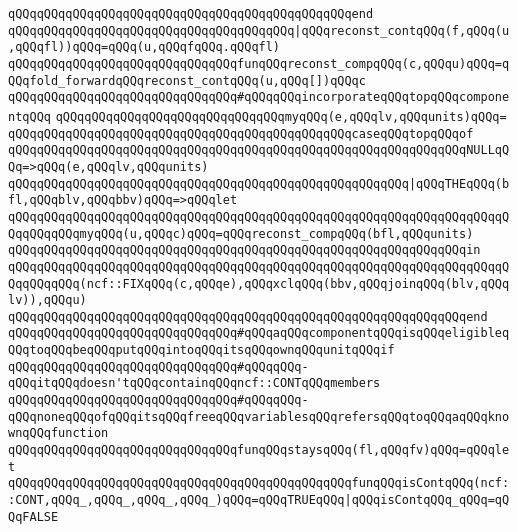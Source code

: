 \verb|qQQqqQQqqQQqqQQqqQQqqQQqqQQqqQQqqQQqqQQqqQQqqQQqend|\newline
\verb|qQQqqQQqqQQqqQQqqQQqqQQqqQQqqQQqqQQqqQQq|\verb#|qQQqreconst_contqQQq(f,qQQq(u,qQQqfl))qQQq=qQQq(u,qQQqfqQQq.qQQqfl)#\newline
\verb|qQQqqQQqqQQqqQQqqQQqqQQqqQQqqQQqfunqQQqreconst_compqQQq(c,qQQqu)qQQq=qQQqfold_forwardqQQqreconst_contqQQq(u,qQQq[])qQQqc|\newline
\newline
\verb|qQQqqQQqqQQqqQQqqQQqqQQqqQQqqQQq#qQQqqQQqincorporateqQQqtopqQQqcomponentqQQq|\newline
\verb|qQQqqQQqqQQqqQQqqQQqqQQqqQQqqQQqmyqQQq(e,qQQqlv,qQQqunits)qQQq=|\newline
\verb|qQQqqQQqqQQqqQQqqQQqqQQqqQQqqQQqqQQqqQQqqQQqqQQqcaseqQQqtopqQQqof|\newline
\verb|qQQqqQQqqQQqqQQqqQQqqQQqqQQqqQQqqQQqqQQqqQQqqQQqqQQqqQQqqQQqqQQqNULLqQQq=>qQQq(e,qQQqlv,qQQqunits)|\newline
\verb|qQQqqQQqqQQqqQQqqQQqqQQqqQQqqQQqqQQqqQQqqQQqqQQqqQQqqQQq|\verb#|qQQqTHEqQQq(bfl,qQQqblv,qQQqbbv)qQQq=>qQQqlet#\newline
\verb|qQQqqQQqqQQqqQQqqQQqqQQqqQQqqQQqqQQqqQQqqQQqqQQqqQQqqQQqqQQqqQQqqQQqqQQqqQQqqQQqmyqQQq(u,qQQqc)qQQq=qQQqreconst_compqQQq(bfl,qQQqunits)|\newline
\verb|qQQqqQQqqQQqqQQqqQQqqQQqqQQqqQQqqQQqqQQqqQQqqQQqqQQqqQQqqQQqqQQqin|\newline
\verb|qQQqqQQqqQQqqQQqqQQqqQQqqQQqqQQqqQQqqQQqqQQqqQQqqQQqqQQqqQQqqQQqqQQqqQQqqQQqqQQq(ncf::FIXqQQq(c,qQQqe),qQQqxclqQQq(bbv,qQQqjoinqQQq(blv,qQQqlv)),qQQqu)|\newline
\verb|qQQqqQQqqQQqqQQqqQQqqQQqqQQqqQQqqQQqqQQqqQQqqQQqqQQqqQQqqQQqqQQqend|\newline
\newline
\verb|qQQqqQQqqQQqqQQqqQQqqQQqqQQqqQQq#qQQqaqQQqcomponentqQQqisqQQqeligibleqQQqtoqQQqbeqQQqputqQQqintoqQQqitsqQQqownqQQqunitqQQqif|\newline
\verb|qQQqqQQqqQQqqQQqqQQqqQQqqQQqqQQq#qQQqqQQq-qQQqitqQQqdoesn'tqQQqcontainqQQqncf::CONTqQQqmembers|\newline
\verb|qQQqqQQqqQQqqQQqqQQqqQQqqQQqqQQq#qQQqqQQq-qQQqnoneqQQqofqQQqitsqQQqfreeqQQqvariablesqQQqrefersqQQqtoqQQqaqQQqknownqQQqfunction|\newline
\verb|qQQqqQQqqQQqqQQqqQQqqQQqqQQqqQQqfunqQQqstaysqQQq(fl,qQQqfv)qQQq=qQQqlet|\newline
\verb|qQQqqQQqqQQqqQQqqQQqqQQqqQQqqQQqqQQqqQQqqQQqqQQqfunqQQqisContqQQq(ncf::CONT,qQQq_,qQQq_,qQQq_,qQQq_)qQQq=qQQqTRUEqQQq|\verb#|qQQqisContqQQq_qQQq=qQQqFALSE#\newline

